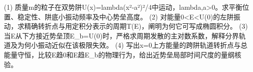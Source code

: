 (1) 质量m的粒子在双势阱U(x)=lambda(x²-a²)²/4中运动，lambda,a>0。求平衡位置、稳定性、阱底小振动频率及中心势垒高度。
(2) 对能量0<E<U(0)的左阱振动，求精确转折点与用定积分表示的周期T(E)，阐明为何它可写成椭圆积分。
(3) 当E从下方接近势垒顶E_b=U(0)时，严格求周期发散的主对数系数，解释分界轨道及为何小振动近似在该极限失效。
(4) 写出x=0上方能量的跨阱轨道转折点与总能量守恒，比较E趋0和E趋E_b的物理行为，给出近势垒局部时间尺度的量纲核验。
